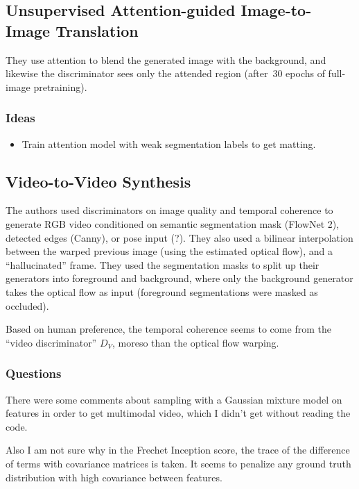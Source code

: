 \documentclass[a4paper, 12pt]{article}
\begin{document}
\subsection{Unsupervised Attention-guided Image-to-Image
            Translation~\cite{mejjati2018unsupervised}}

They use attention to blend the generated image with the background, and
likewise the discriminator sees only the attended region (after~\num{30} epochs
of full-image pretraining).


\subsubsection{Ideas}

\begin{itemize}
        \item Train attention model with weak segmentation labels to get
                matting.
\end{itemize}


\subsection{Video-to-Video Synthesis~\cite{wang2018vid2vid}}

The authors used discriminators on image quality and temporal coherence to
generate RGB video conditioned on semantic segmentation mask (FlowNet 2),
detected edges (Canny), or pose input (?). They also used a bilinear
interpolation between the warped previous image (using the estimated optical
flow), and a ``hallucinated'' frame. They used the segmentation masks to split
up their generators into foreground and background, where only the background
generator takes the optical flow as input (foreground segmentations were masked
as occluded).

Based on human preference, the temporal coherence seems to come from the
``video discriminator'' $D_V$, moreso than the optical flow warping.


\subsubsection{Questions}

There were some comments about sampling with a Gaussian mixture model on
features in order to get multimodal video, which I didn't get without reading
the code.

Also I am not sure why in the Frechet Inception score, the trace of the
difference of terms with covariance matrices is taken. It seems to penalize any
ground truth distribution with high covariance between features.
\end{document}
